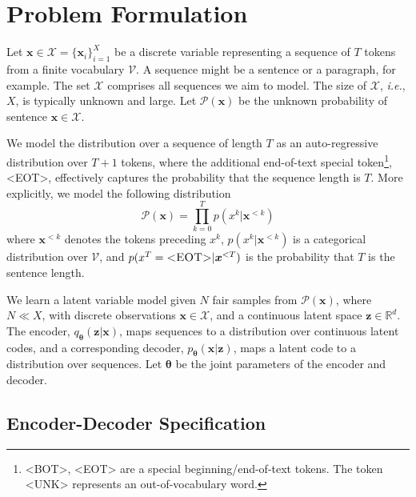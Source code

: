 \documentclass{article}
\newcommand{\bs}{\boldsymbol}
\newcommand{\ie}{{\em i.e.}}
\newcommand{\x}{{\bs{x}}}
\newcommand{\z}{{\bs z}}
\newcommand{\params}{{\bs \theta}}
\newcommand{\pjoint}{\mathcal{P}}
\newcommand{\pdec}{p}
\newcommand{\penc}{q}
\newcommand{\Mdec}{\pdec_{\params}}
\newcommand{\Menc}{\penc_{\params}}
\begin{document}
 

\section{Problem Formulation}

Let $\x \in \mathcal{X} = \{\x_i\}_{i=1}^{X}$ be a discrete variable representing
a sequence of $T$ tokens from a finite vocabulary $\mathcal{V}$.
A sequence might be a sentence or a paragraph, for example.
The set $\mathcal{X}$ comprises all sequences we aim to model.
The size of $\mathcal{X}$, \ie, $X$, is typically unknown and large.
Let $\pjoint(\x)$ be the unknown probability of sentence $\x \in \mathcal{X}$.

We model the distribution over a sequence of length $T$ as an auto-regressive distribution over $T+1$ tokens, 
where the additional end-of-text special token\footnote{\textsc{<BOT>}, \textsc{<EOT>} are a special beginning/end-of-text tokens. The token \textsc{<UNK>} represents an out-of-vocabulary word.},  \textsc{<EOT>}, 
effectively captures the probability that the sequence length is $T$.
More explicitly, we model the following distribution
\begin{equation}
    \pjoint(\x) = \prod_{k=0}^{T} \pdec(x^k | \x^{<k})
\end{equation}
where $\x^{<k}$ denotes the tokens preceding $x^k$,
$\pdec(x^k | \x^{<k})$ is a categorical distribution over $\mathcal{V}$, 
and $\pdec(x^{T} = \text{\textsc{<EOT>}} | \x^{<T})$ is the probability that $T$ is the sentence length.

We learn a latent variable model given $N$ fair samples from $\pjoint(\x)$, where $N \ll X$, with
discrete observations $\x \in \mathcal{X}$, and a continuous latent space $\z \in \mathbb{R}^{d}$.
The encoder, $\Menc(\z | \x)$, maps sequences to a distribution over continuous latent codes,
and a corresponding decoder, $\Mdec(\x|\z)$, maps a latent code to a distribution over sequences.
Let $\params$ be the joint parameters of the encoder and decoder.







\subsection{Encoder-Decoder Specification} \label{sec:nlp-formulation}
\end{document}
